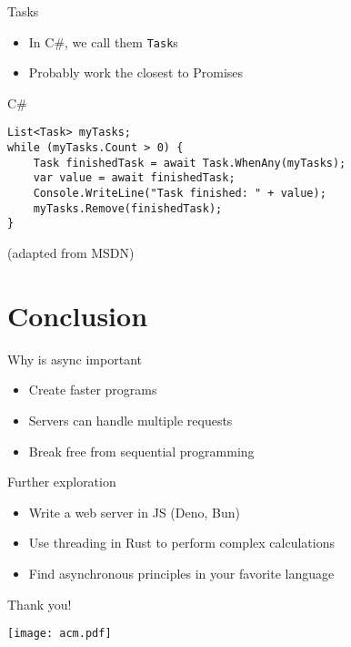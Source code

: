 \documentclass{beamer}
\begin{document}
\begin{frame}[fragile]{Tasks}
	\begin{itemize}
		\item In C\#, we call them \texttt{Task}s
		\item Probably work the closest to Promises
	\end{itemize}
	\begin{block}{C\#}
\begin{verbatim}
List<Task> myTasks;
while (myTasks.Count > 0) {
	Task finishedTask = await Task.WhenAny(myTasks);
	var value = await finishedTask;
	Console.WriteLine("Task finished: " + value);
	myTasks.Remove(finishedTask);
}
\end{verbatim}
	\end{block}
(adapted from MSDN)
\end{frame}

\section{Conclusion}
\begin{frame}{Why is async important}
	\begin{itemize}
		\item Create faster programs
		\item Servers can handle multiple requests
		\item Break free from sequential programming
	\end{itemize}
\end{frame}

\begin{frame}{Further exploration}
	\begin{itemize}
		\item Write a web server in JS (Deno, Bun)
		\item Use threading in Rust to perform complex calculations
		\item Find asynchronous principles in your favorite language
	\end{itemize}
\end{frame}

\begin{frame}{Thank you!}

	\centering
	\texttt{[image: acm.pdf]}
	
\end{frame}
\end{document}

